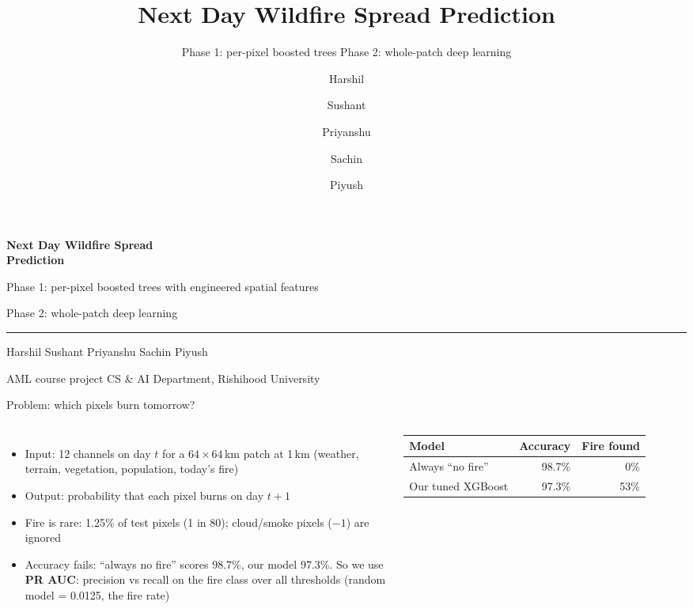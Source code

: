 \documentclass[aspectratio=169,11pt]{beamer}
\title{Next Day Wildfire Spread Prediction}
\subtitle{Phase 1: per-pixel boosted trees \quad Phase 2: whole-patch deep learning}
\author{Harshil \and Sushant \and Priyanshu \and Sachin \and Piyush}
\institute{AML course project \quad CS \& AI Department, Rishihood University}
\date{}
\begin{document}
\begin{frame}[plain]
\vfill
{\color{accent}\Huge\bfseries Next Day Wildfire Spread\\[0.2em] Prediction\par}
\vspace{0.6em}
{\large Phase 1: per-pixel boosted trees with engineered spatial features\par}
\vspace{0.2em}
{\large Phase 2: whole-patch deep learning\par}
\vspace{0.4em}
{\color{accent}\rule{3cm}{1.5pt}\par}
\vspace{1.2em}
Harshil \quad Sushant \quad Priyanshu \quad Sachin \quad Piyush\par
\vspace{0.3em}
{\small\color{muted}AML course project \quad CS \& AI Department, Rishihood University\par}
\vfill
\end{frame}

\begin{frame}{Problem: which pixels burn tomorrow?}
\begin{columns}[T]
\small
\begin{itemize}
\item Input: 12 channels on day $t$ for a $64\times64$\,km patch at 1\,km (weather, terrain, vegetation, population, today's fire)
\item Output: probability that each pixel burns on day $t{+}1$
\item Fire is rare: 1.25\% of test pixels (1 in 80); cloud/smoke pixels ($-1$) are ignored
\item Accuracy fails: ``always no fire'' scores 98.7\%, our model 97.3\%. So we use \textbf{PR AUC}: precision vs recall on the fire class over all thresholds (random model = 0.0125, the fire rate)
\end{itemize}
\centering
\vspace{2.5em}
\footnotesize
\begin{tabular}{@{}l r r@{}}
\toprule
Model & Accuracy & Fire found \\
\midrule
Always ``no fire'' & 98.7\% & 0\% \\
Our tuned XGBoost & 97.3\% & 53\% \\
\bottomrule
\end{tabular}
\end{columns}
\end{frame}
\end{document}
